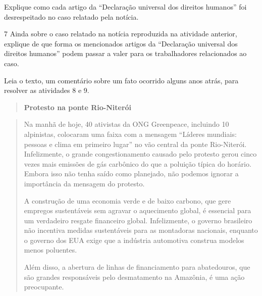 Explique como cada artigo da ``Declaração universal dos direitos
humanos'' foi desrespeitado no caso relatado pela notícia.


\num{7} Ainda sobre o caso relatado na notícia reproduzida na atividade
anterior, explique de que forma os mencionados artigos da ``Declaração
universal dos direitos humanos'' podem passar a valer para os
trabalhadores relacionados ao caso.


Leia o texto, um comentário sobre um fato ocorrido alguns anos atrás,
para resolver as atividades 8 e 9.

\begin{quote}
\textbf{Protesto na ponte Rio-Niterói}
\end{quote}

\begin{quote}
Na manhã de hoje, 40 ativistas da ONG Greenpeace, incluindo 10
alpinistas, colocaram uma faixa com a mensagem ``Líderes mundiais:
pessoas e clima em primeiro lugar'' no vão central da ponte Rio-Niterói.
Infelizmente, o grande congestionamento causado pelo protesto gerou
cinco vezes mais emissões de gás carbônico do que a poluição típica do
horário. Embora isso não tenha saído como planejado, não podemos ignorar
a importância da mensagem do protesto.

A construção de uma economia verde e de baixo carbono, que gere empregos
sustentáveis sem agravar o aquecimento global, é essencial para um
verdadeiro resgate financeiro global. Infelizmente, o governo brasileiro
não incentiva medidas sustentáveis para as montadoras nacionais,
enquanto o governo dos EUA exige que a indústria automotiva construa
modelos menos poluentes.

Além disso, a abertura de linhas de financiamento para abatedouros, que
são grandes responsáveis pelo desmatamento na Amazônia, é uma ação
preocupante.
\end{quote}


